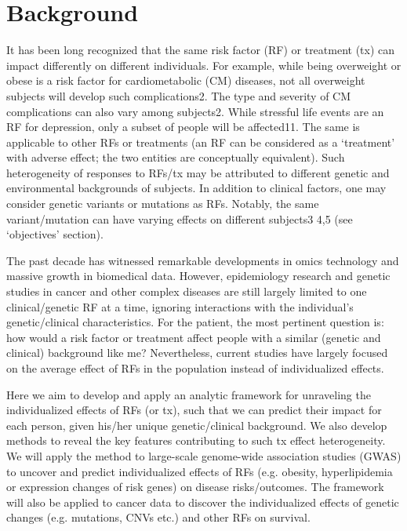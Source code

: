\section{Background}
\label{sec:ite_bg}
  It has been long recognized that the same risk factor (RF) or treatment (tx) can impact differently on different individuals. For example, while being overweight or obese is a risk factor for cardiometabolic (CM) diseases, not all overweight subjects will develop such complications2. The type and severity of CM complications can also vary among subjects2. While stressful life events are an RF for depression, only a subset of people will be affected11. The same is applicable to other RFs or treatments (an RF can be considered as a ‘treatment’ with adverse effect; the two entities are conceptually equivalent). Such heterogeneity of responses to RFs/tx may be attributed to different genetic and environmental backgrounds of subjects. In addition to clinical factors, one may consider genetic variants or mutations as RFs. Notably, the same variant/mutation can have varying effects on different subjects3 4,5 (see ‘objectives’ section). 

  The past decade has witnessed remarkable developments in omics technology and massive growth in biomedical data. However, epidemiology research and genetic studies in cancer and other complex diseases are still largely limited to one clinical/genetic RF at a time, ignoring interactions with the individual’s genetic/clinical characteristics. For the patient, the most pertinent question is: how would a risk factor or treatment affect people with a similar (genetic and clinical) background like me? Nevertheless, current studies have largely focused on the average effect of RFs in the population instead of individualized effects. 

  Here we aim to develop and apply an analytic framework for unraveling the individualized effects of RFs (or tx), such that we can predict their impact for each person, given his/her unique genetic/clinical background.  We also develop methods to reveal the key features contributing to such tx effect heterogeneity. We will apply the method to large-scale genome-wide association studies (GWAS) to uncover and predict individualized effects of RFs (e.g. obesity, hyperlipidemia or expression changes of risk genes) on disease risks/outcomes. The framework will also be applied to cancer data to discover the individualized effects of genetic changes (e.g. mutations, CNVs etc.) and other RFs on survival.

